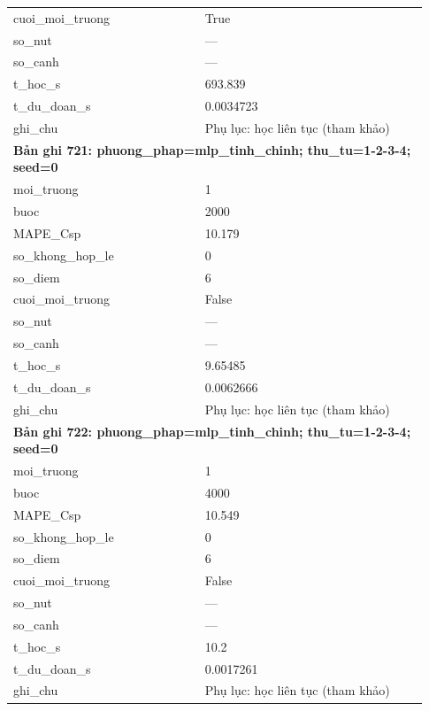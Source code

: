 \begin{longtable}{p{0.43\linewidth}p{0.50\linewidth}}
cuoi\_\allowbreak moi\_\allowbreak truong & True \\
so\_\allowbreak nut & — \\
so\_\allowbreak canh & — \\
t\_\allowbreak hoc\_\allowbreak s & 693.839 \\
t\_\allowbreak du\_\allowbreak doan\_\allowbreak s & 0.0034723 \\
ghi\_\allowbreak chu & Phụ lục: học liên tục (tham khảo) \\
\midrule
\multicolumn{2}{p{0.95\linewidth}}{\textbf{Bản ghi 721: phuong\_phap=mlp\_tinh\_chinh; thu\_tu=1-2-3-4; seed=0}} \\
moi\_\allowbreak truong & 1 \\
buoc & 2000 \\
MAPE\_\allowbreak Csp & 10.179 \\
so\_\allowbreak khong\_\allowbreak hop\_\allowbreak le & 0 \\
so\_\allowbreak diem & 6 \\
cuoi\_\allowbreak moi\_\allowbreak truong & False \\
so\_\allowbreak nut & — \\
so\_\allowbreak canh & — \\
t\_\allowbreak hoc\_\allowbreak s & 9.65485 \\
t\_\allowbreak du\_\allowbreak doan\_\allowbreak s & 0.0062666 \\
ghi\_\allowbreak chu & Phụ lục: học liên tục (tham khảo) \\
\midrule
\multicolumn{2}{p{0.95\linewidth}}{\textbf{Bản ghi 722: phuong\_phap=mlp\_tinh\_chinh; thu\_tu=1-2-3-4; seed=0}} \\
moi\_\allowbreak truong & 1 \\
buoc & 4000 \\
MAPE\_\allowbreak Csp & 10.549 \\
so\_\allowbreak khong\_\allowbreak hop\_\allowbreak le & 0 \\
so\_\allowbreak diem & 6 \\
cuoi\_\allowbreak moi\_\allowbreak truong & False \\
so\_\allowbreak nut & — \\
so\_\allowbreak canh & — \\
t\_\allowbreak hoc\_\allowbreak s & 10.2 \\
t\_\allowbreak du\_\allowbreak doan\_\allowbreak s & 0.0017261 \\
ghi\_\allowbreak chu & Phụ lục: học liên tục (tham khảo) \\

\end{longtable}
